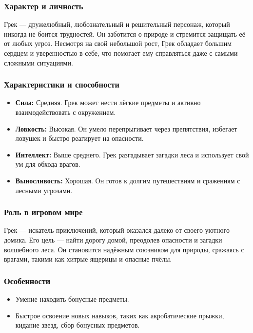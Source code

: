 \documentclass{article}
\begin{document}
\subsubsection{Характер и личность} 
Грек — дружелюбный, любознательный и решительный персонаж, который никогда не боится трудностей. Он заботится о природе и стремится защищать её от любых угроз. Несмотря на свой небольшой рост, Грек обладает большим сердцем и уверенностью в себе, что помогает ему справляться даже с самыми сложными ситуациями.

\subsubsection{Характеристики и способности} 
\begin{itemize}
    \item \textbf{Сила:} Средняя. Грек может нести лёгкие предметы и активно взаимодействовать с окружением.
    \item \textbf{Ловкость:} Высокая. Он умело перепрыгивает через препятствия, избегает ловушек и быстро реагирует на опасности.
    \item \textbf{Интеллект:} Выше среднего. Грек разгадывает загадки леса и использует свой ум для обхода врагов.
    \item \textbf{Выносливость:} Хорошая. Он готов к долгим путешествиям и сражениям с лесными угрозами.
\end{itemize}

\subsubsection{Роль в игровом мире} 
Грек — искатель приключений, который оказался далеко от своего уютного домика. Его цель — найти дорогу домой, преодолев опасности и загадки волшебного леса. Он становится надёжным союзником для природы, сражаясь с врагами, такими как хитрые ящерицы и опасные пчёлы.

\subsubsection{Особенности} 
\begin{itemize}
    \item Умение находить бонусные предметы.
    \item Быстрое освоение новых навыков, таких как акробатические прыжки, кидание звезд, сбор бонусных предметов.
\end{itemize}
\end{document}
